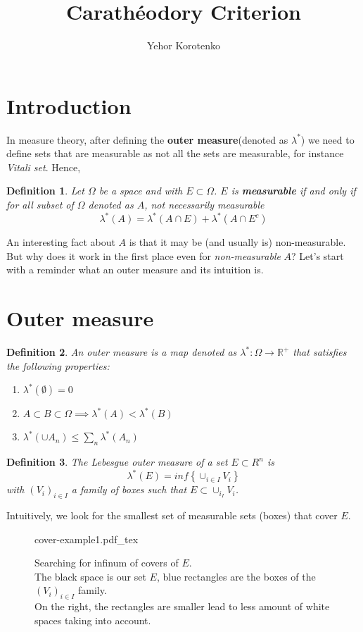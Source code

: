 \documentclass[a4paper]{article}
\author{Yehor Korotenko}
\title{Carathéodory Criterion}
\newcommand{\incfig}[1]{%
    \def\svgwidth{\columnwidth}
    {#1.pdf_tex}
}
\newcommand{\R}{\mathbb{R}}
\newtheorem{definition}{Definition}[section]
\begin{document}
\section{Introduction}
   In measure theory, after defining the \textbf{outer measure}(denoted as $\lambda^*$) we need to
   define sets that are measurable as not all the sets are measurable, for
   instance \textit{Vitali set}. Hence,
\begin{definition}
Let $\Omega$ be a space and with $E \subset \Omega$. $E$ is  \textbf{measurable} if and only if for all subset of $\Omega$ denoted as $A$, not necessarily measurable
\[
\lambda^*(A) = \lambda^*(A \cap E) + \lambda^*(A \cap E^c)
\] 
\end{definition}
An interesting fact about $A$ is that it may be (and usually is)
non-measurable. But why does it work in the first place even for
\textit{non-measurable} $A$? Let's start with a reminder what an outer measure and its intuition is.

\section{Outer measure}%
\label{sec:Outer measure}
\begin{definition}
    An outer measure is a map denoted as $\lambda^*: \Omega \to \R^+$ that satisfies the following properties:
    \begin{enumerate}
        \item $\lambda^*(\emptyset) = 0$
        \item $A \subset B \subset \Omega \implies \lambda^*(A) < \lambda^*(B)$ 
        \item $\lambda^*(\cup A_n) \le \sum_n \lambda^*(A_n)$
    \end{enumerate}
\end{definition}
\begin{definition}
    The Lebesgue outer measure of a set $E \subset R^n$ is 
    \[
        \lambda^*(E) = inf \left\{ \cup_{i \in I} V_i \right\}
    \] 
    with $(V_i)_{i \in I}$ a family of boxes such that $E \subset \cup_{i_I} V_i$.
\end{definition}

Intuitively, we look for the smallest set of measurable sets (boxes) that cover
$E$.  

\begin{figure}[H]
    \centering
    \incfig{cover-example1}
    \caption{Searching for infinum of covers of $E$. \\ The black space is our
        set $E$, blue rectangles are the boxes of the  $(V_i)_{i \in I}$
        family.\\ On the right, the
    rectangles are smaller lead to less amount of white spaces taking into
account.}
    \label{fig:cover-example1}
\end{figure}
\end{document}
